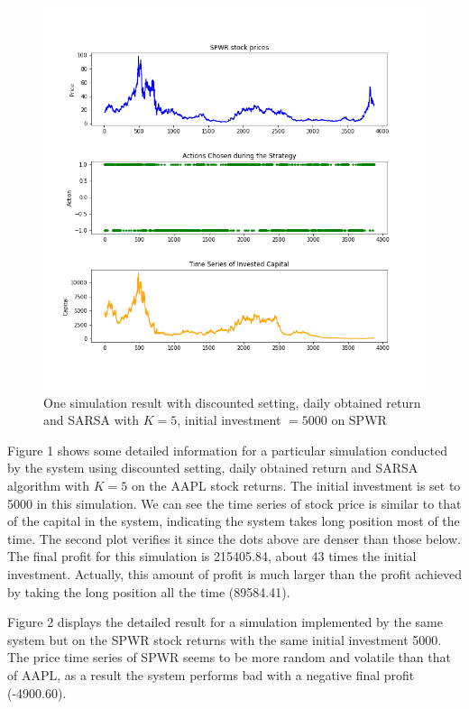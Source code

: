 \documentclass{article}
\begin{document}
\begin{figure}[H]
	\centering
	\includegraphics[scale=0.4]{figs/figure2.png}
	\caption{One simulation result with discounted setting, daily obtained return and SARSA with $K = 5$, initial investment $= 5000$ on SPWR} 
	\label{figure2}
\end{figure}

\indent Figure 1 shows some detailed information for a particular simulation conducted by the system using discounted setting, daily obtained return and SARSA algorithm with $K = 5$ on the AAPL stock returns. The initial investment is set to 5000 in this simulation. We can see the time series of stock price is similar to that of the capital in the system, indicating the system takes long position most of the time. The second plot verifies it since the dots above are denser than those below. The final profit for this simulation is 215405.84, about 43 times the initial investment. Actually, this amount of profit is much larger than the profit achieved by taking the long position all the time (89584.41).


\indent Figure 2 displays the detailed result for a simulation implemented by the same system but on the SPWR stock returns with the same initial investment 5000. The price time series of SPWR seems to be more random and volatile than that of AAPL, as a result the system performs bad with a negative final profit (-4900.60). 
\end{document}
